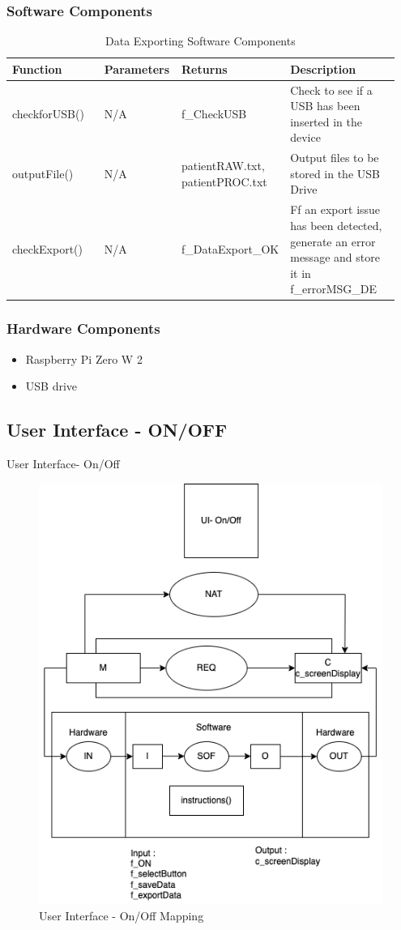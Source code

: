 \documentclass{article}
\newcounter{mnum}
\newcommand{\mthemnum}{M\themnum}
\begin{document}
\begin{description}
        \subsubsection{Software Components}
                \begin{longtable}{|p{0.25\linewidth}|p{0.2\linewidth}|p{0.2\linewidth}|p{0.30\linewidth}|}
                \caption{Data Exporting Software Components}
                \hline
                \textbf{Function} & \textbf{Parameters} & \textbf {Returns} & \textbf{Description} \\
                \endhead
                \hline
                checkforUSB()  & N/A  & f\_CheckUSB &  Check to see if a USB has been inserted in the device\\
                \hline
                outputFile()  & N/A & patientRAW.txt, patientPROC.txt & Output files to be stored in the USB Drive \\
                \hline
                checkExport()  & N/A & f\_DataExport\_OK & Ff an export issue has been detected, generate an error message and store it in f\_errorMSG\_DE \\
                \hline
                \end{longtable}
            \noindent
        \subsubsection{Hardware Components}
            \begin{itemize}
            \item Raspberry Pi Zero W 2
            \item USB drive
            \end{itemize}
    \newpage
    
    \subsection{User Interface - ON/OFF}
    \item [\refstepcounter{mnum} \mthemnum \label{UI_O_F}:] User Interface- On/Off
    \begin{figure}[!htb]
    	\centering
    	\includegraphics[width=0.5\linewidth]{mccharts-UI- ON_OFF.drawio.png}
    	\caption{User Interface - On/Off Mapping}
    \end{figure}

\end{description}
\end{document}
